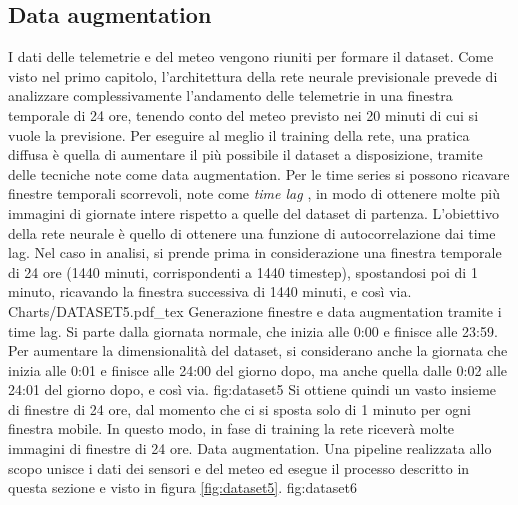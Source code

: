 \subsection{Data augmentation}\label{dataaugmentation}
I dati delle telemetrie e del meteo vengono riuniti per formare il dataset. Come visto nel primo capitolo, l’architettura della rete neurale previsionale prevede di analizzare complessivamente l’andamento delle telemetrie in una finestra temporale di 24 ore, tenendo conto del meteo previsto nei 20 minuti di cui si vuole la previsione. Per eseguire al meglio il training della rete, una pratica diffusa è quella di aumentare il più possibile il dataset a disposizione, tramite delle tecniche note come data augmentation. Per le time series si possono ricavare finestre temporali scorrevoli, note come \textit{time lag} \cite{wei_1990}, in modo di ottenere molte più immagini di giornate intere rispetto a quelle del dataset di partenza. L'obiettivo della rete neurale è quello di ottenere una funzione di autocorrelazione dai time lag. Nel caso in analisi, si prende prima in considerazione una finestra temporale di 24 ore (1440 minuti, corrispondenti a 1440 timestep), spostandosi poi di 1 minuto, ricavando la finestra successiva di 1440 minuti, e così via.
\svg
{Charts/DATASET5.pdf_tex}
{Generazione finestre e data augmentation tramite i time lag. Si parte dalla giornata normale, che inizia alle 0:00 e finisce alle 23:59. Per aumentare la dimensionalità del dataset, si considerano anche la giornata che inizia alle 0:01 e finisce alle 24:00 del giorno dopo, ma anche quella dalle 0:02 alle 24:01 del giorno dopo, e così via.}
{fig:dataset5}
Si ottiene quindi un vasto insieme di finestre di 24 ore, dal momento che ci si sposta solo di 1 minuto per ogni finestra mobile. In questo modo, in fase di training la rete riceverà molte immagini di finestre di 24 ore.
{Data augmentation. Una pipeline realizzata allo scopo unisce i dati dei sensori e del meteo ed esegue il processo descritto in questa sezione e visto in figura \ref{fig:dataset5}.}
{fig:dataset6}
